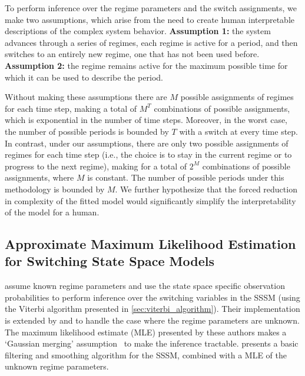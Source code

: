 To perform inference over the regime parameters and the switch assignments, we make two assumptions, which arise from the need to create human interpretable descriptions of the complex system behavior. \textbf{Assumption 1:} the system advances through a series of regimes, each regime is active for a period, and then switches to an entirely new regime, one that has not been used before. \textbf{Assumption 2:} the regime remains active for the maximum possible time for which it can be used to describe the period.

Without making these assumptions there are $M$ possible assignments of regimes for each time step, making a total of $M^T$ combinations of possible assignments, which is exponential in the number of time steps. Moreover, in the worst case, the number of possible periods is bounded by $T$ with a switch at every time step. In contrast, under our assumptions, there are only two possible assignments of regimes for each time step (i.e., the choice is to stay in the current regime or to progress to the next regime), making for a total of $2^M$ combinations of possible assignments, where $M$ is constant.  The number of possible periods under this methodology is bounded by $M$. We further hypothesize that the forced reduction in complexity of the fitted model would significantly simplify the interpretability of the model for a human.

\subsection{Approximate Maximum Likelihood Estimation for Switching State Space Models}\label{sec:gaussian_merging}

\cite{shumway1991dynamic} assume known regime parameters and use the state space specific observation probabilities to perform inference over the switching variables in the SSSM (using the Viterbi algorithm presented in \ref{sec:viterbi_algorithm}). Their implementation is extended by \cite{kim1994dynamic, kim1999state} and \cite{bar1993estimation} to handle the case where the regime parameters are unknown. The maximum likelihood estimate (MLE) presented by these authors makes a `Gaussian merging' assumption~\citep{ghahramani2000variational} to make the inference tractable. \cite{kim1994dynamic} presents a basic filtering and smoothing algorithm for the SSSM, combined with a MLE of the unknown regime parameters.


